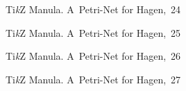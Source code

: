 \documentclass[a4paper,11pt]{article}
\begin{document}
\begin{figure}[ht]

  \centering

  \begin{tikzpicture}



  \end{tikzpicture}

  \caption{Ti\emph{k}Z Manula. A~Petri-Net for Hagen,~24}

\end{figure}





\begin{figure}[ht]

  \centering

  \begin{tikzpicture}



  \end{tikzpicture}

  \caption{Ti\emph{k}Z Manula. A~Petri-Net for Hagen,~25}

\end{figure}





\begin{figure}[ht]

  \centering

  \begin{tikzpicture}



  \end{tikzpicture}

  \caption{Ti\emph{k}Z Manula. A~Petri-Net for Hagen,~26}

\end{figure}





\begin{figure}[ht]

  \centering

  \begin{tikzpicture}



  \end{tikzpicture}

  \caption{Ti\emph{k}Z Manula. A~Petri-Net for Hagen,~27}

\end{figure}
\end{document}
